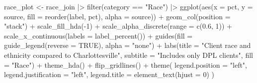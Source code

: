 \documentclass[
  letterpaper,
  DIV=11,
  numbers=noendperiod]{scrartcl}
\newenvironment{Shaded}{\begin{snugshade}}{\end{snugshade}}
\newcommand{\AttributeTok}[1]{\textcolor[rgb]{0.40,0.45,0.13}{#1}}
\newcommand{\ConstantTok}[1]{\textcolor[rgb]{0.56,0.35,0.01}{#1}}
\newcommand{\DecValTok}[1]{\textcolor[rgb]{0.68,0.00,0.00}{#1}}
\newcommand{\FloatTok}[1]{\textcolor[rgb]{0.68,0.00,0.00}{#1}}
\newcommand{\FunctionTok}[1]{\textcolor[rgb]{0.28,0.35,0.67}{#1}}
\newcommand{\NormalTok}[1]{\textcolor[rgb]{0.00,0.23,0.31}{#1}}
\newcommand{\OtherTok}[1]{\textcolor[rgb]{0.00,0.23,0.31}{#1}}
\newcommand{\SpecialCharTok}[1]{\textcolor[rgb]{0.37,0.37,0.37}{#1}}
\newcommand{\StringTok}[1]{\textcolor[rgb]{0.13,0.47,0.30}{#1}}
\begin{document}
\begin{Shaded}
\begin{Highlighting}[]
\NormalTok{race\_plot }\OtherTok{\textless{}{-}}\NormalTok{ race\_join }\SpecialCharTok{|\textgreater{}} 
  \FunctionTok{filter}\NormalTok{(category }\SpecialCharTok{==} \StringTok{"Race"}\NormalTok{) }\SpecialCharTok{|\textgreater{}} 
  \FunctionTok{ggplot}\NormalTok{(}\FunctionTok{aes}\NormalTok{(}\AttributeTok{x =}\NormalTok{ pct, }\AttributeTok{y =}\NormalTok{ source, }\AttributeTok{fill =} \FunctionTok{reorder}\NormalTok{(label, pct), }\AttributeTok{alpha =}\NormalTok{ source)) }\SpecialCharTok{+}
    \FunctionTok{geom\_col}\NormalTok{(}\AttributeTok{position =} \StringTok{"stack"}\NormalTok{) }\SpecialCharTok{+}
    \FunctionTok{scale\_fill\_hda}\NormalTok{(}\SpecialCharTok{{-}}\DecValTok{1}\NormalTok{) }\SpecialCharTok{+}
    \FunctionTok{scale\_alpha\_discrete}\NormalTok{(}\AttributeTok{range =} \FunctionTok{c}\NormalTok{(}\FloatTok{0.6}\NormalTok{, }\DecValTok{1}\NormalTok{)) }\SpecialCharTok{+}
    \FunctionTok{scale\_x\_continuous}\NormalTok{(}\AttributeTok{labels =} \FunctionTok{label\_percent}\NormalTok{()) }\SpecialCharTok{+}
    \FunctionTok{guides}\NormalTok{(}\AttributeTok{fill =} \FunctionTok{guide\_legend}\NormalTok{(}\AttributeTok{reverse =} \ConstantTok{TRUE}\NormalTok{),}
           \AttributeTok{alpha =} \StringTok{"none"}\NormalTok{) }\SpecialCharTok{+}
    \FunctionTok{labs}\NormalTok{(}\AttributeTok{title =} \StringTok{"Client race and ethnicity compared to Charlottesville"}\NormalTok{,}
         \AttributeTok{subtitle =} \StringTok{"Includes only DPL clients"}\NormalTok{,}
         \AttributeTok{fill =} \StringTok{"Race"}\NormalTok{) }\SpecialCharTok{+}
    \FunctionTok{theme\_hda}\NormalTok{() }\SpecialCharTok{+}
    \FunctionTok{flip\_gridlines}\NormalTok{() }\SpecialCharTok{+}
    \FunctionTok{theme}\NormalTok{(}
      \AttributeTok{legend.position =} \StringTok{"left"}\NormalTok{,}
      \AttributeTok{legend.justification =} \StringTok{"left"}\NormalTok{,}
      \AttributeTok{legend.title =} \FunctionTok{element\_text}\NormalTok{(}\AttributeTok{hjust =} \DecValTok{0}\NormalTok{)}
\NormalTok{    )}


\end{Highlighting}
\end{Shaded}
\end{document}
